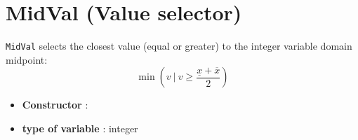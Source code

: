\section{MidVal (Value selector)}\label{midval:midvalvalselector}\hypertarget{midval:midvalvalselector}{}
\begin{notedef}
  \texttt{MidVal} selects the closest value (equal or greater) to the integer variable domain midpoint:
$$\min(v\ |\ v\ge \frac{\underline{x}+\overline{x}}{2})$$
\end{notedef}

\begin{itemize}
	\item \textbf{Constructor} : 
	\item \textbf{type of variable} : integer
\end{itemize}

%

